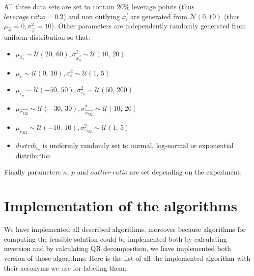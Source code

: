 All three data sets are set to contain $20\%$ leverage points (thus $leverage~ratio = 0.2$) and non outlying $\vec{x_i}$ are generated from $\mathcal{N}(0,10)$ (thus $\mu_{\vec{x}} = 0, \sigma^{2}_{\vec{x}} = 10$). Other parameters are independently randomly generated from uniform distribution so that:
\begin{itemize}
    \item $\mu_{\vec{x_o}} \sim \mathcal{U}(20,\,60), \sigma^{2}_{\vec{x_o}} \sim \mathcal{U}(10,\,20)$
    \item $\mu_{\varepsilon} \sim \mathcal{U}(0,\,10), \sigma^{2}_{\varepsilon}  \sim \mathcal{U}(1,\,5)$ 
    \item $\mu_{\varepsilon_o} \sim \mathcal{U}(-50,\,50), \sigma^{2}_{\varepsilon_o} \sim \mathcal{U}(50,\,200)$
    \item $\mu_{\vec{x_{M2}}} \sim \mathcal{U}(-30,\,30), \sigma^{2}_{\vec{x_{M2}}} \sim \mathcal{U}(10,\,20)$
    \item  $\mu_{\varepsilon_{M2}}  \sim \mathcal{U}(-10,\,10) , \sigma^{2}_{\varepsilon_{M2}}\sim \mathcal{U}(1,\,5)$
    \item $distrib_{\varepsilon_o}$ is uniformly randomly set to normal, log-normal  or exponential distribution 
\end{itemize}
Finally parameters $n$, $p$ and $outlier~ratio$  are set depending on the experiment.

\section{Implementation of the algorithms}
We have implemented all described algorithms, moreover because algorithms for computing the feasible solution could be implemented both by calculating inversion and by calculating QR decomposition, we have implemented both version of those algorithms. Here is the list of all the implemented algorithm with their acronyms we use for labeling them:

